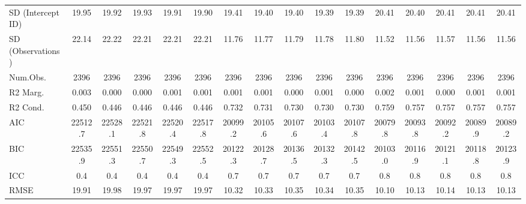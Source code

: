 \documentclass[]{report}
\begin{document}
\begin{table}
{\begin{tabular}[t]{lccccccccccccccc}
		SD (Intercept ID) & \num{19.95} & \num{19.92} & \num{19.93} & \num{19.91} & \num{19.90} & \num{19.41} & \num{19.40} & \num{19.40} & \num{19.39} & \num{19.39} & \num{20.41} & \num{20.40} & \num{20.41} & \num{20.41} & \num{20.41}\\
		SD (Observations) & \num{22.14} & \num{22.22} & \num{22.21} & \num{22.21} & \num{22.21} & \num{11.76} & \num{11.77} & \num{11.79} & \num{11.78} & \num{11.80} & \num{11.52} & \num{11.56} & \num{11.57} & \num{11.56} & \num{11.56}\\
		\midrule
		Num.Obs. & \num{2396} & \num{2396} & \num{2396} & \num{2396} & \num{2396} & \num{2396} & \num{2396} & \num{2396} & \num{2396} & \num{2396} & \num{2396} & \num{2396} & \num{2396} & \num{2396} & \num{2396}\\
		R2 Marg. & \num{0.003} & \num{0.000} & \num{0.000} & \num{0.001} & \num{0.001} & \num{0.001} & \num{0.001} & \num{0.000} & \num{0.001} & \num{0.000} & \num{0.002} & \num{0.001} & \num{0.000} & \num{0.001} & \num{0.001}\\
		R2 Cond. & \num{0.450} & \num{0.446} & \num{0.446} & \num{0.446} & \num{0.446} & \num{0.732} & \num{0.731} & \num{0.730} & \num{0.730} & \num{0.730} & \num{0.759} & \num{0.757} & \num{0.757} & \num{0.757} & \num{0.757}\\
		AIC & \num{22512.7} & \num{22528.1} & \num{22521.8} & \num{22520.4} & \num{22517.8} & \num{20099.2} & \num{20105.6} & \num{20107.6} & \num{20103.4} & \num{20107.8} & \num{20079.8} & \num{20093.8} & \num{20092.2} & \num{20089.9} & \num{20089.2}\\
		BIC & \num{22535.9} & \num{22551.3} & \num{22550.7} & \num{22549.3} & \num{22552.5} & \num{20122.3} & \num{20128.7} & \num{20136.5} & \num{20132.3} & \num{20142.5} & \num{20103.0} & \num{20116.9} & \num{20121.1} & \num{20118.8} & \num{20123.9}\\
		ICC & \num{0.4} & \num{0.4} & \num{0.4} & \num{0.4} & \num{0.4} & \num{0.7} & \num{0.7} & \num{0.7} & \num{0.7} & \num{0.7} & \num{0.8} & \num{0.8} & \num{0.8} & \num{0.8} & \num{0.8}\\
		RMSE & \num{19.91} & \num{19.98} & \num{19.97} & \num{19.97} & \num{19.97} & \num{10.32} & \num{10.33} & \num{10.35} & \num{10.34} & \num{10.35} & \num{10.10} & \num{10.13} & \num{10.14} & \num{10.13} & \num{10.13}\\
		\bottomrule
	\end{tabular}}
\end{table}
\end{document}

